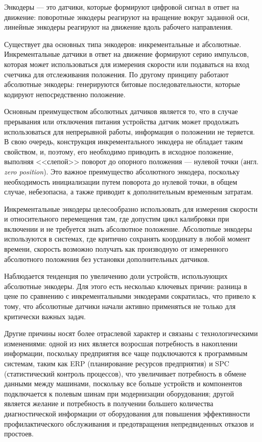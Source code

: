 Энкодеры --- это датчики, которые формируют цифровой сигнал в ответ на движение: поворотные энкодеры реагируют на вращение вокруг заданной оси, линейные энкодеры реагируют на движение вдоль рабочего направления.

Существует два основных типа энкодеров: инкрементальные и абсолютные. Инкрементальные датчики в ответ на движение формируют серию импульсов, которая может использоваться для измерения скорости или подаваться на вход счетчика для отслеживания положения. По другому принципу работают абсолютные энкодеры: генерируются битовые последовательности, которые кодируют непосредственно положение.

Основным преимуществом абсолютных датчиков является то, что в случае прерывания или отключения питания устройства датчик может продолжать использоваться для непрерывной работы, информация о положении не теряется. В свою очередь, конструкция инкрементального энкодера не обладает таким свойством, и, поэтому, его необходимо приводить в исходное положение, выполняя <<слепой>> поворот до опорного положения --- нулевой точки (англ. \textit{zero position}). Это важное преимущество абсолютного энкодера, поскольку необходимость инициализации путем поворота до нулевой точки, в общем случае, небезопасна, а также приводит к дополнительным временным затратам.

Инкрементальные энкодеры целесообразно использовать для измерения скорости и относительного перемещения там, где допустим цикл калибровки при включении и не требуется знать абсолютное положение. Абсолютные энкодеры используются в системах, где критично сохранять координату в любой момент времени, скорость возможно получать как производную от измеренного абсолютного положения без установки дополнительных датчиков.

Наблюдается тенденция по увеличению доли устройств, использующих абсолютные энкодеры. Для этого есть несколько ключевых причин: разница в цене по сравнению с инкрементальными энкодерами сократилась, что привело к тому, что абсолютные датчики начали активно применяться не только для критически важных задач.

Другие причины носят более отраслевой характер и связаны с технологическими изменениями: одной из них является возросшая потребность в накоплении информации, поскольку предприятия все чаще подключаются к программным системам, таким как ERP (планирование ресурсов предприятия) и SPC (статистический контроль процессов), что увеличивает потребность в обмене данными между машинами, поскольку все больше устройств и компонентов подключается к полевым шинам при модернизации оборудования; другой является желание и потребность в получении большего количества диагностической информации от оборудования для повышения эффективности профилактического обслуживания и предотвращения непредвиденных отказов и простоев.

